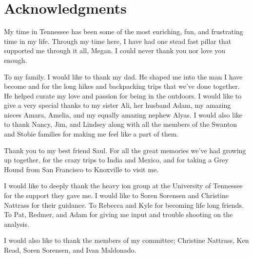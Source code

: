 \chapter*{Acknowledgments}\label{ch:acknowledgments}
My time in Tennessee has been some of the most enriching, fun, and frustrating time in my life.  Through my time here, I have had one stead fast pillar that supported me through it all, Megan.  I could never thank you nor love you enough.

\par
To my family. I would like to thank my dad.  He shaped  me into the man I have become and for the long hikes and backpacking trips that we've done together.  He helped curate my love and passion for being in the outdoors.  I would like to give a very special thanks to my sister Ali, her husband Adam, my amazing nieces Amara, Amelia, and my equally amazing nephew Alyas.  I would also like to thank Nancy, Jim, and Lindsey along with all the members of the Swanton and Stobie families for making me feel like a part of them.  

\par
Thank you to my best friend Saul.  For all the great memories we've had growing up together, for the crazy trips to India and Mexico, and for taking a Grey Hound from San Francisco to Knoxville to visit me.  

\par
I would like to deeply thank the heavy ion group at the University of Tennessee for the support they gave me.  I would like to Soren Sorensen and Christine Nattrass for their guidance.  To Rebecca and Kyle for becoming life long friends.  To Pat, Redmer, and Adam for giving me input and trouble shooting on the analysis.

\par 
I would also like to thank the members of my committee; Christine Nattrass, Ken Read, Soren Sorensen, and Ivan Maldonado. 

